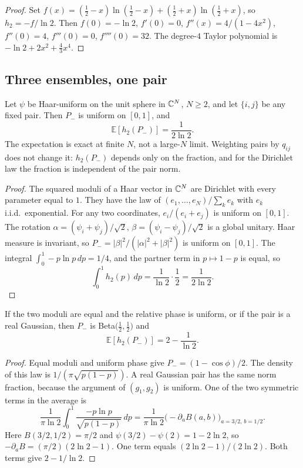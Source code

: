 \begin{proof}
Set \(f(x)=(\tfrac12-x)\ln(\tfrac12-x)+(\tfrac12+x)\ln(\tfrac12+x)\),
so \(h_2=-f/\ln 2\).
Then \(f(0)=-\ln 2\), \(f'(0)=0\),
\(f''(x)=4/(1-4x^2)\), \(f''(0)=4\), \(f'''(0)=0\), \(f''''(0)=32\).
The degree-\(4\) Taylor polynomial is \(-\ln 2+2x^2+\tfrac43 x^4\).
\end{proof}

\subsection{Three ensembles, one pair}

\begin{theorem}
\label{thm:haar}
Let \(\psi\) be Haar-uniform on the unit sphere in \(\mathbb{C}^N\), \(N\ge 2\),
and let \(\{i,j\}\) be any fixed pair.
Then \(P_-\) is uniform on \([0,1]\), and
\[
\mathbb{E}[h_2(P_-)]=\frac{1}{2\ln 2}.
\]
The expectation is exact at finite \(N\), not a large-\(N\) limit.
Weighting pairs by \(q_{ij}\) does not change it:
\(h_2(P_-)\) depends only on the fraction, and for the Dirichlet law
the fraction is independent of the pair norm.
\end{theorem}

\begin{proof}
The squared moduli of a Haar vector in \(\mathbb{C}^N\) are Dirichlet with every
parameter equal to \(1\).
They have the law of \((e_1,\ldots,e_N)/\sum_k e_k\) with \(e_k\) i.i.d.\
exponential.
For any two coordinates,
\(e_i/(e_i+e_j)\) is uniform on \([0,1]\).
The rotation
\(\alpha=(\psi_i+\psi_j)/\sqrt{2}\),
\(\beta=(\psi_i-\psi_j)/\sqrt{2}\)
is a global unitary.
Haar measure is invariant, so
\(P_-=|\beta|^2/(|\alpha|^2+|\beta|^2)\) is uniform on \([0,1]\).
The integral \(\int_0^1 -p\ln p\,dp=1/4\), and the partner term in \(p\mapsto 1-p\)
is equal, so
\[
\int_0^1 h_2(p)\,dp=\frac{1}{\ln 2}\cdot\frac12=\frac{1}{2\ln 2}.
\]
\end{proof}

\begin{proposition}
\label{prop:arcsine}
If the two moduli are equal and the relative phase is uniform,
or if the pair is a real Gaussian,
then \(P_-\) is Beta\(\bigl(\tfrac12,\tfrac12\bigr)\) and
\[
\mathbb{E}[h_2(P_-)]=2-\frac{1}{\ln 2}.
\]
\end{proposition}

\begin{proof}
Equal moduli and uniform phase give
\(P_-=(1-\cos\phi)/2\).
The density of this law is \(1/(\pi\sqrt{p(1-p)})\).
A real Gaussian pair has the same norm fraction, because the argument of
\((g_1,g_2)\) is uniform.
One of the two symmetric terms in the average is
\[
\frac{1}{\pi\ln 2}\int_0^1\frac{-p\ln p}{\sqrt{p(1-p)}}\,dp
=\frac{1}{\pi\ln 2}\bigl(-\partial_a B(a,b)\bigr)_{a=3/2,\,b=1/2}.
\]
Here \(B(3/2,1/2)=\pi/2\) and \(\psi(3/2)-\psi(2)=1-2\ln 2\),
so \(-\partial_a B=(\pi/2)(2\ln 2-1)\).
One term equals \((2\ln 2-1)/(2\ln 2)\).
Both terms give \(2-1/\ln 2\).
\end{proof}


